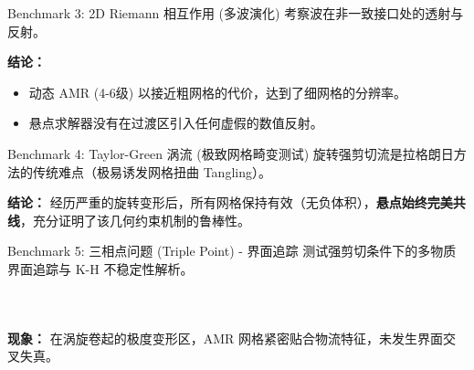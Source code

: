 \documentclass{beamer}
\begin{document}
	\begin{frame}{Benchmark 3: 2D Riemann 相互作用 (多波演化)}
		考察波在非一致接口处的透射与反射。
		\begin{figure}[htpb]
			\centering
		\end{figure}
		\textbf{结论：} 
		\begin{itemize}
			\item 动态 AMR (4-6级) 以接近粗网格的代价，达到了细网格的分辨率。
			\item 悬点求解器没有在过渡区引入任何虚假的数值反射。
		\end{itemize}
	\end{frame}
	
	\begin{frame}{Benchmark 4: Taylor-Green 涡流 (极致网格畸变测试)}
		旋转强剪切流是拉格朗日方法的传统难点（极易诱发网格扭曲 Tangling）。
		\begin{figure}[htpb]
			\centering
		\end{figure}
		\textbf{结论：} 经历严重的旋转变形后，所有网格保持有效（无负体积），\textbf{悬点始终完美共线}，充分证明了该几何约束机制的鲁棒性。
	\end{frame}
	
	\begin{frame}{Benchmark 5: 三相点问题 (Triple Point) - 界面追踪}
		测试强剪切条件下的多物质界面追踪与 K-H 不稳定性解析。
		\begin{columns}
			\begin{figure}[htpb]
				\centering
				\fbox{\begin{minipage}[c][4.5cm][c]{\linewidth}
						\centering
						\textcolor{gray}{[图片占位] 图 12: 整体网格对比}
				\end{minipage}}
			\end{figure}
			
			\begin{figure}[htpb]
				\centering
				\fbox{\begin{minipage}[c][4.5cm][c]{\linewidth}
						\centering
						\textcolor{gray}{[图片占位] 图 13: 卷起区域的局部放大网格}
				\end{minipage}}
			\end{figure}
		\end{columns}
		\textbf{现象：} 在涡旋卷起的极度变形区，AMR 网格紧密贴合物流特征，未发生界面交叉失真。
	\end{frame}
	
\end{document}

